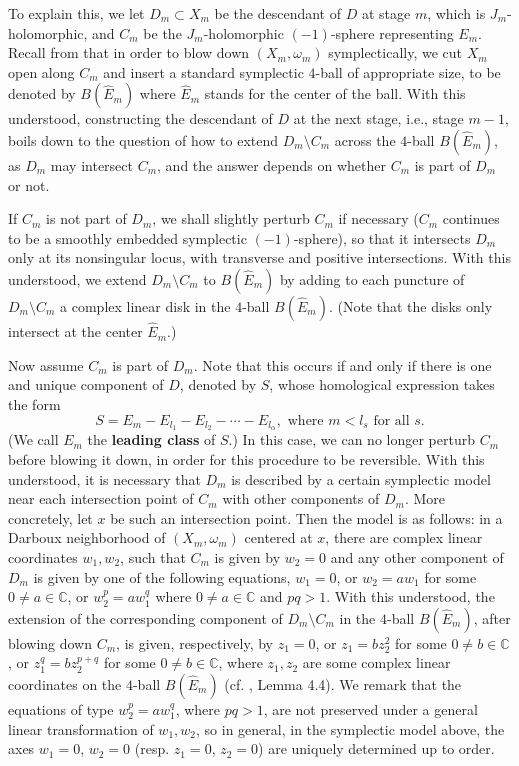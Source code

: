 \documentclass[11pt]{amsart}
\theoremstyle{plain}
\numberwithin{theorem}{section}
\theoremstyle{definition}
\newcommand{\C}{{\mathbb C}}
\begin{document}
To explain this, we let $D_m\subset X_m$ be the descendant of $D$ at stage $m$, which is $J_m$-holomorphic, and $C_m$ be the $J_m$-holomorphic $(-1)$-sphere representing $E_m$. Recall from \cite{C1} that
in order to blow down $(X_m,\omega_m)$ symplectically, we cut $X_m$ open along $C_m$ and insert a standard symplectic $4$-ball of appropriate size, to be denoted by $B(\hat{E}_m)$ where 
$\hat{E}_m$ stands for the center of the ball. With this understood, constructing
the descendant of $D$ at the next stage, i.e., stage $m-1$, boils down to the question of 
how to extend $D_m\setminus C_m$ across the $4$-ball $B(\hat{E}_m)$, as $D_m$ may intersect $C_m$, and the answer depends on whether $C_m$ is part of $D_m$ or not.

If $C_m$ is not part of $D_m$, we shall slightly perturb $C_m$ if necessary ($C_m$ continues to be a smoothly embedded symplectic $(-1)$-sphere), so that it intersects $D_m$ only at its nonsingular locus, with transverse and positive intersections. With this understood, we extend $D_m\setminus C_m$ to $B(\hat{E}_m)$ by adding to each puncture of $D_m\setminus C_m$ a complex linear disk in 
the $4$-ball $B(\hat{E}_m)$. (Note that the disks only intersect at the center $\hat{E}_m$.)

Now assume $C_m$ is part of $D_m$. Note that this occurs if and only if there is one and unique 
component of $D$, denoted by $S$, whose homological expression takes the form 
$$
S=E_m-E_{l_1}-E_{l_2}-\cdots-E_{l_\alpha}, \mbox{ where $m<l_s$ for all $s$}. 
$$
(We call $E_m$ the {\bf leading class} of $S$.) In this case, we can no longer perturb $C_m$ before blowing it down, in order for this procedure to be reversible. With this understood, it is necessary 
that $D_m$ is described by a certain symplectic model near each intersection point of $C_m$ with other components of $D_m$. More concretely, let $x$ be such an intersection point. Then the 
model is as follows: in a Darboux neighborhood of 
$(X_m,\omega_m)$ centered at $x$, there are complex linear coordinates $w_1,w_2$, such that $C_m$ is given by $w_2=0$ and any other component of $D_m$ is given by one of the following equations, $w_1=0$, or $w_2=aw_1$ for some $0\neq a\in\C$, or $w_2^p=aw_1^q$ where $0\neq a\in\C$ and $pq>1$. With this understood, the extension of the corresponding component of $D_m\setminus C_m$ in the $4$-ball $B(\hat{E}_m)$, after blowing down $C_m$, is given, respectively, by $z_1=0$, or $z_1=bz_2^2$ for some $0\neq b\in\C$, or $z_1^q=bz_2^{p+q}$ for some $0\neq b\in\C$, where $z_1,z_2$ are some complex linear coordinates on the $4$-ball $B(\hat{E}_m)$ (cf. \cite{C1}, Lemma 4.4). We remark that the equations of type $w_2^p=aw_1^q$, where $pq>1$, are not preserved under a general linear transformation of $w_1,w_2$, so in general, in the symplectic model above, the axes $w_1=0$, $w_2=0$ (resp. $z_1=0$, $z_2=0$) are uniquely determined up to order. 
\end{document}
